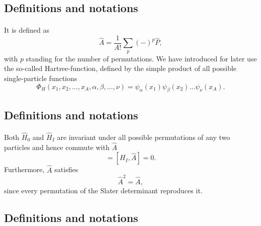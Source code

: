\documentclass[%
twoside,                 %
final,                   %
10pt]{article}
\begin{document}
\subsection*{Definitions and notations}

\paragraph{}
It is defined as
\begin{equation}
  \hat{A} = \frac{1}{A!}\sum_{p} (-)^p\hat{P},
\label{antiSymmetryOperator}
\end{equation}
with $p$ standing for the number of permutations. We have introduced for later use the so-called
Hartree-function, defined by the simple product of all possible single-particle functions
\[
  \Phi_H(x_1,x_2,\dots,x_A,\alpha,\beta,\dots,\nu) =
  \psi_{\alpha}(x_1)
    \psi_{\beta}(x_2)\dots\psi_{\nu}(x_A).
\]



\subsection*{Definitions and notations}

\paragraph{}
Both $\hat{H}_0$ and $\hat{H}_I$ are invariant under all possible permutations of any two particles
and hence commute with $\hat{A}$
\begin{equation}
  [H_0,\hat{A}] = [H_I,\hat{A}] = 0. \label{commutionAntiSym}
\end{equation}
Furthermore, $\hat{A}$ satisfies
\begin{equation}
  \hat{A}^2 = \hat{A},  \label{AntiSymSquared}
\end{equation}
since every permutation of the Slater
determinant reproduces it.



\subsection*{Definitions and notations}

\end{document}
